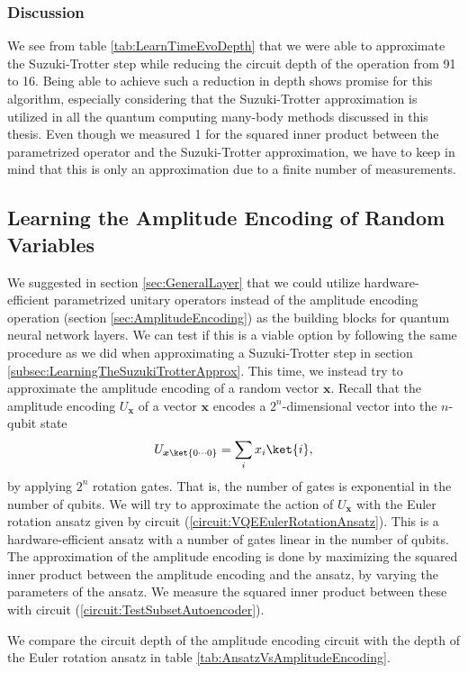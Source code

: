 \subsubsection{Discussion}
We see from table \ref{tab:LearnTimeEvoDepth} that we were able to approximate the Suzuki-Trotter step while reducing the circuit depth of the operation from 91 to 16. Being able to achieve such a reduction in depth shows promise for this algorithm, especially considering that the Suzuki-Trotter approximation is utilized in all the quantum computing many-body methods discussed in this thesis. Even though we measured 1 for the squared inner product between the parametrized operator and the Suzuki-Trotter approximation, we have to keep in mind that this is only an approximation due to a finite number of measurements.


\subsection{Learning the Amplitude Encoding of Random Variables}
\label{subsec:LearningAmpEncRandVar}

We suggested in section \ref{sec:GeneralLayer} that we could utilize hardware-efficient parametrized unitary operators instead of the amplitude encoding operation (section \ref{sec:AmplitudeEncoding}) as the building blocks for quantum neural network layers. We can test if this is a viable option by following the same procedure as we did when approximating a Suzuki-Trotter step in section \ref{subsec:LearningTheSuzukiTrotterApprox}. This time, we instead try to approximate the amplitude encoding of a random vector $\boldsymbol{x}$. Recall that the amplitude encoding $U_{\boldsymbol{x}}$ of a vector $\boldsymbol{x}$ encodes a $2
^n$-dimensional vector into the $n$-qubit state
$$
U_{\boldsymbol{x}\ket{0\cdots 0}} = \sum_{i}x_i\ket{i},
$$
by applying $2^n$ rotation gates. That is, the number of gates is exponential in the number of qubits.
We will try to approximate the action of $U_{\boldsymbol{x}}$ with the Euler rotation ansatz given by circuit (\ref{circuit:VQEEulerRotationAnsatz}). This is a hardware-efficient ansatz with a number of gates linear in the number of qubits. The approximation of the amplitude encoding is done by maximizing the squared inner product between the amplitude encoding and the ansatz, by varying the parameters of the ansatz. We measure the squared inner product between these with circuit (\ref{circuit:TestSubsetAutoencoder}).

We compare the circuit depth of the amplitude encoding circuit with the depth of the Euler rotation ansatz in table \ref{tab:AnsatzVsAmplitudeEncoding}.


